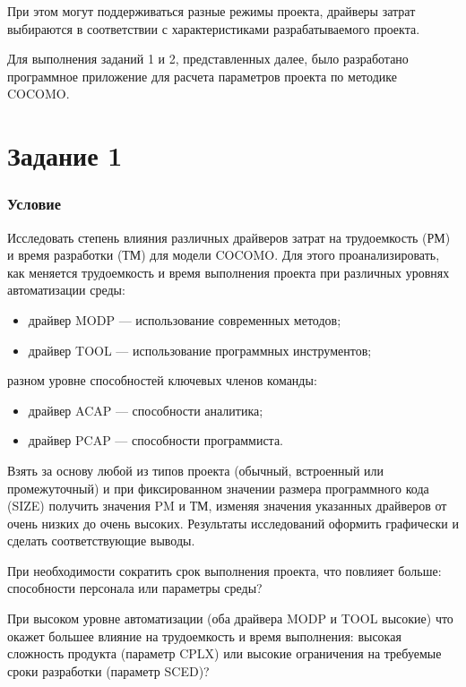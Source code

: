 При этом могут поддерживаться разные режимы проекта, драйверы затрат выбираются в соответствии с характеристиками разрабатываемого проекта.

Для выполнения заданий 1 и 2, представленных далее, было разработано программное приложение для расчета параметров проекта по методике COCOMO.

\section*{Задание 1}

\subsubsection*{Условие}

Исследовать степень влияния различных драйверов затрат на трудоемкость (РМ) и время разработки (ТМ) для модели COCOMO. Для этого проанализировать, как меняется трудоемкость и время выполнения проекта при различных уровнях автоматизации среды:

\begin{itemize}
	\item драйвер MODP --- использование современных методов;
	\item драйвер TOOL --- использование программных инструментов;
\end{itemize}

 разном уровне способностей ключевых членов команды:

\begin{itemize}
	\item драйвер ACAP --- способности аналитика;
	\item драйвер PCAP --- способности программиста.
\end{itemize}

Взять за основу любой из типов проекта (обычный, встроенный или промежуточный) и при фиксированном значении размера программного кода (SIZE) получить значения PM и ТМ, изменяя значения указанных драйверов от очень низких до очень высоких. Результаты исследований оформить графически и сделать соответствующие выводы. 

При необходимости сократить срок выполнения проекта, что повлияет больше: способности персонала или параметры среды? 

При высоком уровне автоматизации (оба драйвера MODP и TOOL высокие) что окажет большее влияние на трудоемкость и время выполнения: высокая сложность продукта (параметр CPLX) или высокие ограничения на требуемые сроки разработки (параметр SCED)?

